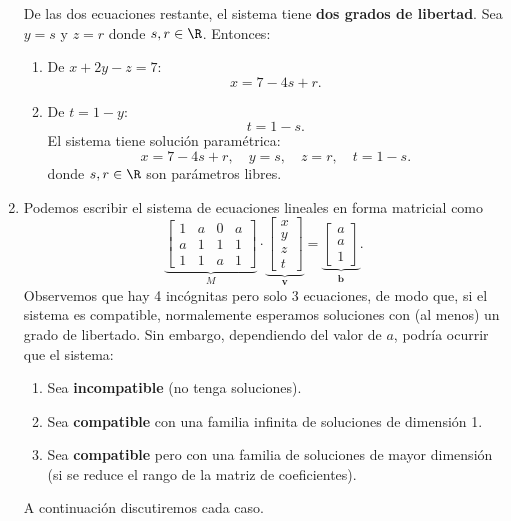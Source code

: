 \begin{enumerate}[label=\color{red}\textbf{\arabic*)}]
\[\] 
De las dos ecuaciones restante, el sistema tiene \textbf{dos grados de libertad}. Sea $y=s$ y $z=r$ donde  $s,r \in\R$. Entonces:
\begin{enumerate}[label=\arabic*)]
    \item De $x+2y-z=7$:  \[
    x=7-4s+r.
    \] 
\item De $t=1-y$:  \[
t=1-s.
\] 
El sistema tiene solución paramétrica: \[
x=7-4s+r, \quad y=s, \quad z=r, \quad t=1-s.
\] donde $s,r \in \R$ son parámetros libres.
\end{enumerate}
\item {} 

Podemos escribir el sistema de ecuaciones lineales en forma matricial como \[
    \underbrace{\begin{bmatrix} 
            1 & a & 0 & a\\
            a & 1 & 1 & 1\\
            1 & 1 & a & 1
    \end{bmatrix} }_M\cdot \underbrace{\begin{bmatrix} 
    x\\
    y\\
    z\\
    t
    \end{bmatrix} }_{\mathbf{v}}=\underbrace{\begin{bmatrix} 
    a\\
    a\\
    1
    \end{bmatrix} }_{\mathbf{b}}.
\] 
Observemos que hay 4 incógnitas pero solo 3 ecuaciones, de modo que, si el sistema es compatible, normalemente esperamos soluciones con (al menos) un grado de libertado. Sin embargo, dependiendo del valor de $a$, podría ocurrir que el sistema:
 \begin{enumerate}[label=\arabic*)]
    \item Sea \textbf{incompatible} (no tenga soluciones).
    \item Sea \textbf{compatible} con una familia infinita de soluciones de dimensión 1.
    \item Sea \textbf{compatible}  pero con una familia de soluciones de mayor dimensión (si se reduce el rango de la matriz de coeficientes).
\end{enumerate}
A continuación discutiremos cada caso.


\end{enumerate}
